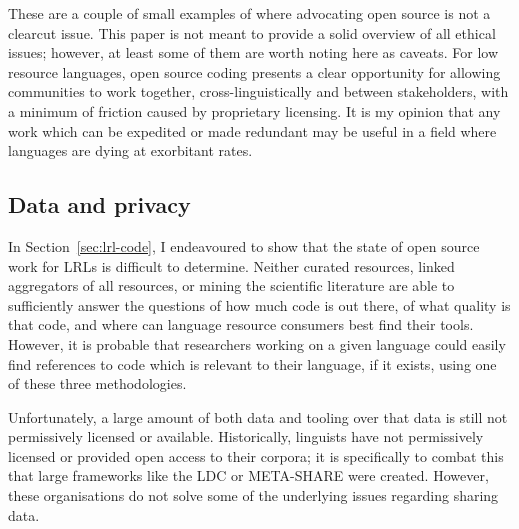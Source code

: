 These are a couple of small examples of where advocating open source is not a clearcut issue. This paper is not meant to provide a solid overview of all ethical issues; however, at least some of them are worth noting here as caveats. For low resource languages, open source coding presents a clear opportunity for allowing communities to work together, cross-linguistically and between stakeholders, with a minimum of friction caused by proprietary licensing. It is my opinion that any work which can be expedited or made redundant may be useful in a field where languages are dying at exorbitant rates.


\subsection{Data and privacy}
\label{subsec:data-and-privacy}

In Section~\ref{sec:lrl-code}, I endeavoured to show that the state of open source work for LRLs is difficult to determine. Neither curated resources, linked aggregators of all resources, or mining the scientific literature are able to sufficiently answer the questions of how much code is out there, of what quality is that code, and where can language resource consumers best find their tools. However, it is probable that researchers working on a given language could easily find references to code which is relevant to their language, if it exists, using one of these three methodologies.

Unfortunately, a large amount of both data and tooling over that data is still not permissively licensed or available. Historically, linguists have not permissively licensed or provided open access to their corpora; it is specifically to combat this that large frameworks like the LDC or META-SHARE were created. However, these organisations do not solve some of the underlying issues regarding sharing data.


